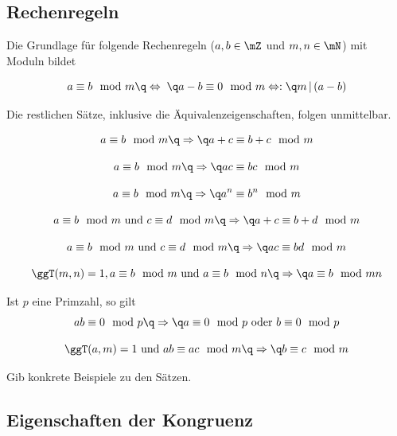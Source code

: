 \documentclass[%
11pt,%
twoside,%
titlepage,%
german,%
headsepline%
]{scrartcl}
\begin{document}
\subsection{Rechenregeln}

Die Grundlage für folgende Rechenregeln ($a,b\in\mZ$ und $m,n\in\mN$) mit Moduln bildet

\begin{csatz}{}
$$
a\equiv b\mod m \q\Leftrightarrow\phantom{:}\q a-b\equiv 0\mod m\Leftrightarrow:\q m\,|\,(a-b)
$$
\end{csatz}
\noindent Die restlichen Sätze, inklusive die Äqui\-valenz\-eigen\-schaf\-ten, folgen unmittelbar.
\begin{csatz}{}
$$a\equiv b\mod m \q\Rightarrow\q a+c\equiv b+c\mod m$$
\end{csatz}
\begin{csatz}{}
$$a\equiv b\mod m \q\Rightarrow\q ac\equiv bc\mod m$$
\end{csatz}
\begin{csatz}{}
$$a\equiv b\mod m \q\Rightarrow\q a^n\equiv b^n\mod m$$
\end{csatz}
\begin{csatz}{}
$$
a\equiv b\mod m \text{ und } c\equiv d\mod m\q\Rightarrow\q a+c\equiv b+d\mod m
$$
\end{csatz}
\begin{csatz}{}
$$
a\equiv b\mod m \text{ und } c\equiv d\mod m\q\Rightarrow\q ac\equiv bd\mod m
$$
\end{csatz}
\begin{csatz}{}
$$
\ggT(m,n)=1, a\equiv b\mod m \text{ und } a\equiv b\mod n\q\Rightarrow\q a\equiv b\mod mn
$$
\end{csatz}
\begin{csatz}[Primzahlprodukt]{}
Ist $p$ eine Primzahl, so gilt
$$
ab\equiv 0\mod p\q\Rightarrow\q a\equiv 0\mod p\textup{ oder }b\equiv0\mod p
$$
\end{csatz}
\begin{csatz}[Kürzungssatz]{}
$$
\ggT(a,m)=1 \textup{ und } ab\equiv ac\mod m\q\Rightarrow\q b\equiv c\mod m
$$
\end{csatz}

\begin{ueb}[Modulo]
Gib konkrete Beispiele zu den Sätzen.
\end{ueb}

\subsection{Eigenschaften der Kongruenz}
\end{document}
